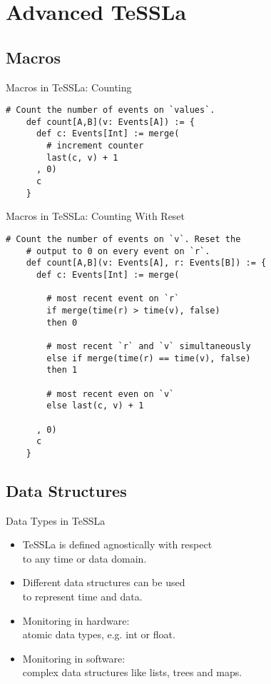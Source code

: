 \section{Advanced TeSSLa}

\subsection{Macros}

\begin{frame}[fragile]{Macros in TeSSLa: Counting}
  \begin{lstlisting}[gobble=4,basicstyle=\ttfamily\footnotesize,language=tessla]
    # Count the number of events on `values`.
    def count[A,B](v: Events[A]) := {
      def c: Events[Int] := merge(
        # increment counter
        last(c, v) + 1
      , 0)
      c
    }
  \end{lstlisting}
\end{frame}

\begin{frame}[fragile]{Macros in TeSSLa: Counting With Reset}
  \begin{lstlisting}[gobble=4,basicstyle=\ttfamily\footnotesize,language=tessla]
    # Count the number of events on `v`. Reset the
    # output to 0 on every event on `r`.
    def count[A,B](v: Events[A], r: Events[B]) := {
      def c: Events[Int] := merge(

        # most recent event on `r`
        if merge(time(r) > time(v), false)
        then 0
      
        # most recent `r` and `v` simultaneously
        else if merge(time(r) == time(v), false)
        then 1
      
        # most recent even on `v`
        else last(c, v) + 1

      , 0)
      c
    }
  \end{lstlisting}
\end{frame}

\subsection{Data Structures}

\begin{frame}{Data Types in TeSSLa}
  \begin{itemize}
    \item TeSSLa is defined \alert{agnostically} with respect\\
      \qquad to \alert{any time or data domain}.
    \item \alert{Different data structures} can be used\\
      \qquad to \alert{represent time and data}.
    \item Monitoring in hardware:\\
      \qquad \alert{atomic data types}, e.g. int or float.
    \item Monitoring in software:\\
      \qquad \alert{complex data structures} like lists, trees and maps.
  \end{itemize}
\end{frame}

